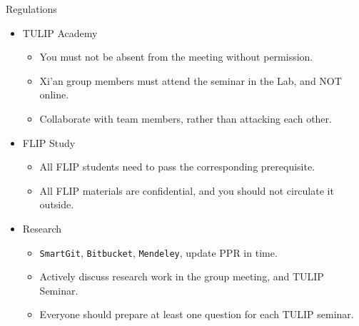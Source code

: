 \documentclass[
 size=14pt,
 paper=smartboard,  %
 mode=present, 		%
 display=slides, 	%
 style=tuliplab,  	%
 pauseslide,
 fleqn,leqno]{powerdot}
\begin{document}
\begin{slide}{Regulations}

\begin{center}
\begin{itemize}

\item<1->
{TULIP Academy}

\begin{itemize}
\item
You must not be absent from the meeting without permission.

\item
Xi'an group members must attend the seminar in the Lab,
and NOT online.

\item
Collaborate with team members, rather than attacking each other.
\end{itemize}

\item<2->
{FLIP Study}

\begin{itemize}
\item
All FLIP students need to pass the corresponding prerequisite.

\item
All FLIP materials are confidential, and you should not circulate it outside.
\end{itemize}

\item<3->
{Research}

\begin{itemize}
\item
\texttt{SmartGit}, \texttt{Bitbucket}, \texttt{Mendeley},
update PPR in time.

\item
Actively discuss research work in the group meeting, and TULIP Seminar.

\item
Everyone should prepare at least one question for each TULIP seminar.
\end{itemize}
\end{itemize}
\end{center}

\end{slide}
\end{document}
